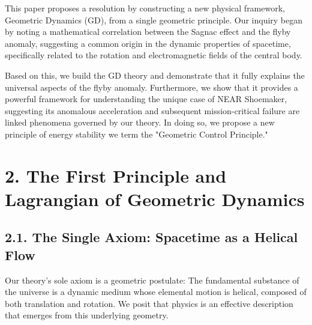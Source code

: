 \documentclass[aps,prl,twocolumn,superscriptaddress,longbibliography,floatfix]{revtex4-2}
\begin{document}
This paper proposes a resolution by constructing a new physical framework, Geometric Dynamics (GD), from a single geometric principle. Our inquiry began by noting a mathematical correlation between the Sagnac effect and the flyby anomaly, suggesting a common origin in the dynamic properties of spacetime, specifically related to the rotation and electromagnetic fields of the central body.

Based on this, we build the GD theory and demonstrate that it fully explains the universal aspects of the flyby anomaly. Furthermore, we show that it provides a powerful framework for understanding the unique case of NEAR Shoemaker, suggesting its anomalous acceleration and subsequent mission-critical failure are linked phenomena governed by our theory. In doing so, we propose a new principle of energy stability we term the "Geometric Control Principle."

\section{2. The First Principle and Lagrangian of Geometric Dynamics}

\subsection{2.1. The Single Axiom: Spacetime as a Helical Flow}
Our theory's sole axiom is a geometric postulate: The fundamental substance of the universe is a dynamic medium whose elemental motion is helical, composed of both translation and rotation. We posit that physics is an effective description that emerges from this underlying geometry.
\end{document}
